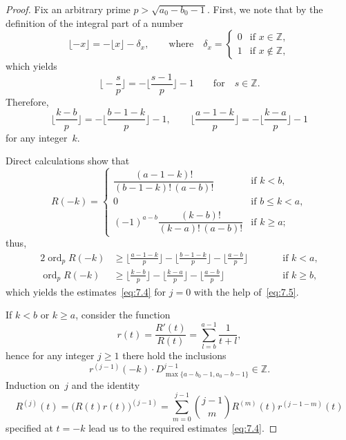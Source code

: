 \documentclass[a4paper,twoside]{article}
\numberwithin{equation}{section}
\renewcommand{\[}{\lfloor}
\renewcommand{\]}{\rfloor}
\newcommand{\<}{\langle}
\renewcommand{\>}{\rangle}
\DeclareMathOperator{\ord}{ord}
\begin{document}
\begin{proof}
Fix an arbitrary prime $p>\sqrt{a_0-b_0-1}$.
First, we note that by the definition of the integral part of a number
$$
\[-x\]=-\[x\]-\delta_x,
\qquad\mbox{where}\quad
\delta_x=\begin{cases}
0 & \mbox{if $x\in\mathbb Z$}, \\
1 & \mbox{if $x\notin\mathbb Z$},
\end{cases}
$$
which yields
$$
\biggl\[-\frac sp\biggr\]=-\biggl\[\frac{s-1}p\biggr\]-1
\qquad\mbox{for}\quad s\in\mathbb Z.
$$
Therefore,
\begin{equation}
\biggl\[\frac{k-b}p\biggr\]
=-\biggl\[\frac{b-1-k}p\biggr\]-1,
\qquad
\biggl\[\frac{a-1-k}p\biggr\]
=-\biggl\[\frac{k-a}p\biggr\]-1
\label{eq:7.5}
\end{equation}
for any integer~$k$.

Direct calculations show that
$$
R(-k)=\begin{cases}
\dfrac{(a-1-k)!}{(b-1-k)!\,(a-b)!}
& \mbox{if $k<b$}, \\
0
& \mbox{if $b\le k<a$}, \\
(-1)^{a-b}\dfrac{(k-b)!}{(k-a)!\,(a-b)!}
& \mbox{if $k\ge a$};
\end{cases}
$$
thus,
$$
\begin{alignedat}{2}{2}
\ord_pR(-k)
&\ge\biggl\[\frac{a-1-k}p\biggr\]
-\biggl\[\frac{b-1-k}p\biggr\]-\biggl\[\frac{a-b}p\biggr\]
\qquad&& \mbox{if $k<a$},
\\
\ord_pR(-k)
&\ge\biggl\[\frac{k-b}p\biggr\]
-\biggl\[\frac{k-a}p\biggr\]-\biggl\[\frac{a-b}p\biggr\]
\qquad&& \mbox{if $k\ge b$},
\end{alignedat}
$$
which yields the estimates~\eqref{eq:7.4} for $j=0$ with the help
of~\eqref{eq:7.5}.

If $k<b$ or $k\ge a$, consider the function
$$
r(t)=\frac{R'(t)}{R(t)}
=\sum_{l=b}^{a-1}\frac1{t+l},
$$
hence for any integer $j\ge1$ there hold the inclusions
$$
r^{(j-1)}(-k)\cdot D_{\max\{a-b_0-1,a_0-b-1\}}^{j-1}\in\mathbb Z.
$$
Induction on~$j$ and the identity
\begin{equation}
R^{(j)}(t)
=\bigl(R(t)r(t)\bigr)^{(j-1)}
=\sum_{m=0}^{j-1}\binom{j-1}mR^{(m)}(t)r^{(j-1-m)}(t)
\label{eq:7.6}
\end{equation}
specified at $t=-k$ lead us to the required estimates~\eqref{eq:7.4}.


\end{proof}
\end{document}
